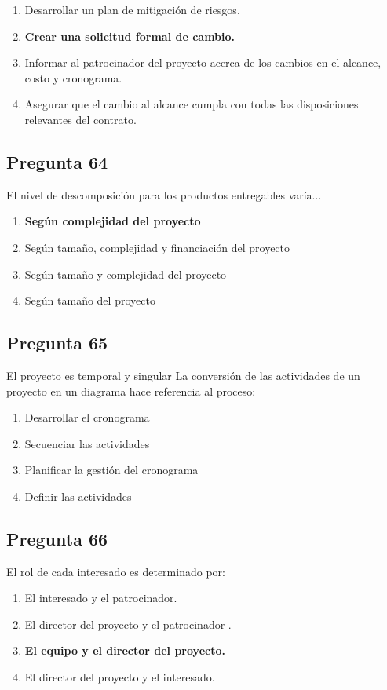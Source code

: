 \documentclass[11pt,a4paper]{article}
\begin{document}
\begin{enumerate}[label=\alph*)]
  \item Desarrollar un plan de mitigación de riesgos.
  \item \textbf{Crear una solicitud formal de cambio.}
  \item Informar al patrocinador del proyecto acerca de los cambios en el alcance, costo y cronograma.
  \item Asegurar que el cambio al alcance cumpla con todas las disposiciones relevantes del contrato.
\end{enumerate}

\subsection*{Pregunta 64}
El nivel de descomposición para los productos entregables varía...

\begin{enumerate}[label=\alph*)]
  \item \textbf{Según complejidad del proyecto}
  \item Según tamaño, complejidad y financiación del proyecto
  \item Según tamaño y complejidad del proyecto
  \item Según tamaño del proyecto
\end{enumerate}

\subsection*{Pregunta 65}
El proyecto es temporal y singular La conversión de las actividades de un proyecto en un diagrama hace referencia al proceso:

\begin{enumerate}[label=\alph*)]
  \item Desarrollar el cronograma
  \item Secuenciar las actividades
  \item Planificar la gestión del cronograma
  \item Definir las actividades
\end{enumerate}

\subsection*{Pregunta 66}
El rol de cada interesado es determinado por:

\begin{enumerate}[label=\alph*)]
  \item El interesado y el patrocinador.
  \item El director del proyecto y el patrocinador .
  \item \textbf{El equipo y el director del proyecto.}
  \item El director del proyecto y el interesado.
\end{enumerate}
\end{document}
